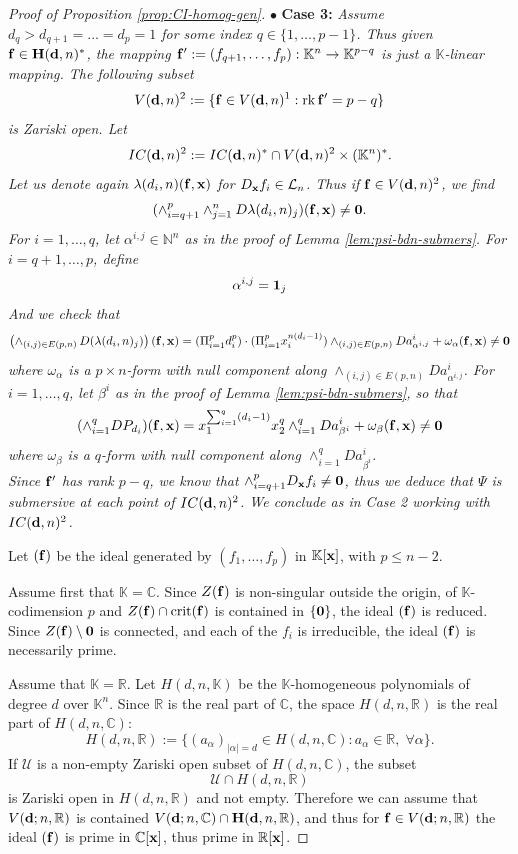 \documentclass[11pt]{amsart}
\newcommand{\field}[1]{\mathbb{#1}}
\newcommand{\C}{\field{C}}
\newcommand{\K}{\field{K}}
\newcommand{\N}{\field{N}}
\newcommand{\R}{\field{R}}
\newcommand{\aph}{{\alpha}}
\newcommand{\bun}{{\bf 1}}
\newcommand{\bbo}{{\bf 0}}
\newcommand{\bd}{{\bf d}}
\newcommand{\bbf}{{\bf f}}
\newcommand{\bH}{{\bf H}}
\newcommand{\bx}{{\bf x}}
\newcommand{\cL}{\mathcal{L}}
\newcommand{\cU}{\mathcal{U}}
\newcommand{\crit}{{\rm crit}}
\newcommand{\Kn}{{\K^n}}
\newcommand{\lbd}{{\lambda}}
\newcommand{\omg}{\omega}
\numberwithin{equation}{section}
\numberwithin{equation}{section}
\begin{document}
\begin{proof}[Proof of Proposition \ref{prop:CI-homog-gen}]
\medskip\noindent
$\bullet$ {\bf Case 3:} \em Assume $d_q >d_{q+1} = \ldots = d_p =1$ for 
some index $q \in \{1,\ldots,p-1\}$. \em Thus given $\bbf \in \bH(\bd,n)^*$,
the mapping $\bbf':=(f_{q+1},\ldots,f_p):\Kn\to \K^{p-q}$ is just a 
$\K$-linear mapping. The following subset 
$$
V(\bd,n)^2 := \{\bbf \in  V(\bd,n)^1 : {\rm rk}\,\bbf' = p-q\}
$$
is Zariski open. Let
$$
IC(\bd,n)^2 := IC(\bd,n)^*\cap V(\bd,n)^2 \times (\Kn)^*.
$$
Let us denote again $\lbd(d_i,n)(\bbf,\bx)$ for $D_\bx f_i \in \cL_n$.
Thus if $\bbf \in V(\bd,n)^2$, we find 
$$
(\wedge_{i=q+1}^p\wedge_{j=1}^n D \lbd(d_i,n)_j)(\bbf,\bx) \neq \bbo.
$$
For $i=1,\ldots,q$, let $\aph^{i,j} \in \N^n$ as in the proof of Lemma 
\ref{lem:psi-bdn-submers}. For $i = q+1,\ldots,p$, define 
$$
\aph^{i,j} = \bun_j
$$
And we check that
$$
\left(\wedge_{(i,j)\in E(p,n)} \, D (\lbd(d_i,n)_j)\right)(\bbf,\bx) = 
(\Pi_{i=1}^p d_i^p) \cdot (\Pi_{i=1}^p x_i^{n(d_i-1)} )
\wedge_{(i,j)\in E(p,n)}  Da_{\aph^{i,j}}^i + \omg_\aph (\bbf,\bx)
\neq \bbo
$$
where $\omg_\aph$ is a $p\times n$-form with null component along 
$\wedge_{(i,j)\in E(p,n)} Da_{\aph^{i,j}}^i$.
For $i=1,\ldots,q$, let $\beta^i$ as in the proof of Lemma 
\ref{lem:psi-bdn-submers}, so that
$$
(\wedge_{i=1}^q D P_{d_i})(\bbf,\bx) = x_1^{\sum_{i=1}^q (d_i-1)}
x_2^q \wedge_{i=1}^q Da_{\beta^i}^i + \omg_\beta(\bbf,\bx) \neq \bbo
$$
where $\omg_\beta$ is a $q$-form with null component along $\wedge_{i=1}^q 
Da_{\beta^i}^i$.
\\
Since $\bbf'$ has rank $p-q$, we know that $\wedge_{i=q+1}^p D_\bx f_i \neq 
\bbo$, thus we deduce that $\Psi$ is submersive at each point of 
$IC(\bd,n)^2$. We conclude as in Case 2 working with $IC(\bd,n)^2$.

\medskip
Let $(\bbf)$ be the ideal generated by $(f_1,\ldots,f_p)$ in $\K[\bx]$,
with $p\leq n-2$.

Assume first that $\K = \C$. Since $Z(\bbf)$ is non-singular outside the 
origin, of $\K$-codimension $p$ and $Z(\bbf)\cap \crit(\bbf)$ is contained
in $\{\bbo\}$, the ideal $(\bbf)$ is reduced. Since $Z(\bbf) \setminus 
\bbo$ is connected, and each of the $f_i$ is irreducible, the ideal
$(\bbf)$ is necessarily prime.

\smallskip
Assume that $\K=\R$.
Let $H(d,n,\K)$ be the $\K$-homogeneous polynomials of degree $d$
over $\Kn$. Since $\R$ is the real part of $\C$,
the space $H(d,n,\R)$ is the real part of $H(d,n,\C)$:
$$
H(d,n,\R) := \{(a_\aph)_{|\aph| =d} \in H(d,n,\C) : a_\aph \in \R, \; 
\forall \aph\}.
$$
If $\cU$ is a non-empty Zariski open subset of $H(d,n,\C)$, the subset 
$$
\cU \cap H(d,n,\R)
$$
is Zariski open in $H(d,n,\R)$ and not empty. Therefore we can assume
that $V(\bd;n,\R)$ is contained $V(\bd;n,\C) \cap \bH(\bd,n,\R)$,
and thus for $\bbf \in V(\bd;n,\R)$ the ideal $(\bbf)$ is prime
in $\C[\bx]$, thus prime in $\R[\bx]$. 
\end{proof}
\end{document}
